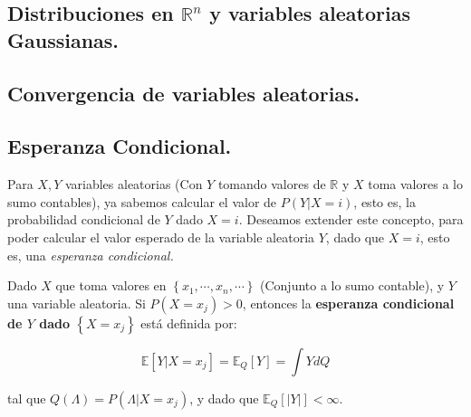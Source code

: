 

\subsection{Distribuciones en $\mathbb{R}^n$ y variables aleatorias Gaussianas.}

















\subsection{Convergencia de variables aleatorias.}






\subsection{Esperanza Condicional.}

Para $X, Y$ variables aleatorias (Con $Y$ tomando valores de $\mathbb{R}$ y $X$ toma valores a lo sumo contables), ya sabemos calcular el valor de $P(Y \vert X = i)$, esto es, la probabilidad condicional de $Y$ dado $X = i$. Deseamos extender este concepto, para poder calcular el valor esperado de la variable aleatoria $Y$, dado que $X = i$, esto es, una \textit{esperanza condicional.}

\begin{boxDef}
 	Dado $X$ que toma valores en $\left\{ x_1, \cdots, x_n, \cdots \right\}$ (Conjunto a lo sumo contable), y $Y$ una variable aleatoria. Si $P(X = x_j) > 0$, entonces la \textbf{esperanza condicional de $Y$ dado $\left\{ X = x_j \right\}$} está definida por:

 	\[
 		\mathbb{E} [Y \vert X = x_j] = \mathbb{E}_Q [Y] = \int Y dQ
 	\]

 	tal que $Q(\Lambda) = P(\Lambda \vert X = x_j)$, y dado que $\mathbb{E}_Q [ \lvert Y \rvert] < \infty$.
\end{boxDef} 

